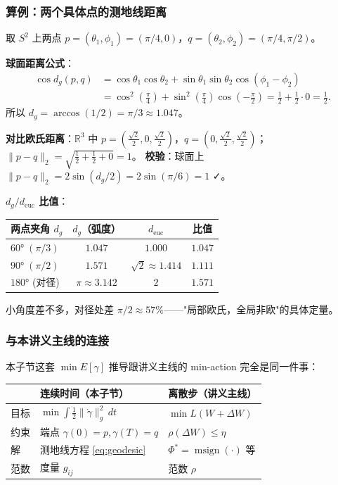 \documentclass[11pt,a4paper]{article}
\theoremstyle{mythm}
\theoremstyle{mydef}
\newcommand{\R}{\mathbb{R}}
\newcommand{\msign}{\operatorname{msign}}
\begin{document}
\subsubsection*{算例：两个具体点的测地线距离}

取 $S^2$ 上两点 $p = (\theta_1,\phi_1) = (\pi/4, 0)$，$q = (\theta_2,\phi_2) = (\pi/4, \pi/2)$。

\textbf{球面距离公式}：
\begin{align*}
\cos d_g(p,q) &= \cos\theta_1\cos\theta_2 + \sin\theta_1\sin\theta_2\cos(\phi_1-\phi_2) \\
              &= \cos^2(\tfrac{\pi}{4}) + \sin^2(\tfrac{\pi}{4})\cos(-\tfrac{\pi}{2}) = \tfrac{1}{2} + \tfrac{1}{2}\cdot 0 = \tfrac{1}{2}.
\end{align*}
所以 $d_g = \arccos(1/2) = \pi/3 \approx 1.047$。

\textbf{对比欧氏距离}：$\R^3$ 中
$p = (\tfrac{\sqrt 2}{2}, 0, \tfrac{\sqrt 2}{2})$，$q = (0, \tfrac{\sqrt 2}{2}, \tfrac{\sqrt 2}{2})$；
$\|p-q\|_2 = \sqrt{\tfrac{1}{2} + \tfrac{1}{2} + 0} = 1$。
\textbf{校验}：球面上 $\|p-q\|_2 = 2\sin(d_g/2) = 2\sin(\pi/6) = 1$ ✓。

\textbf{$d_g/d_{\text{euc}}$ 比值}：
\begin{center}
\begin{tabular}{l|cc|c}
\hline
两点夹角 $d_g$ & $d_g$（弧度） & $d_{\text{euc}}$ & 比值 \\\hline
$60°\;(\pi/3)$ & $1.047$ & $1.000$ & $1.047$ \\
$90°\;(\pi/2)$ & $1.571$ & $\sqrt 2 \approx 1.414$ & $1.111$ \\
$180°$ (对径)   & $\pi \approx 3.142$ & $2$ & $1.571$ \\\hline
\end{tabular}
\end{center}
小角度差不多，对径处差 $\pi/2 \approx 57\%$——"局部欧氏，全局非欧"的具体定量。

\subsubsection*{与本讲义主线的连接}

本子节这套 $\min E[\gamma]$ 推导跟讲义主线的 min-action 完全是同一件事：
\begin{center}
\begin{tabular}{l|l|l}
\hline
& \textbf{连续时间}（本子节） & \textbf{离散步}（讲义主线） \\\hline
目标 & $\min \int \tfrac{1}{2}\|\dot\gamma\|_g^2\,dt$ & $\min L(W + \Delta W)$ \\
约束 & 端点 $\gamma(0) = p,\gamma(T)=q$ & $\rho(\Delta W) \le \eta$ \\
解   & 测地线方程 \eqref{eq:geodesic} & $\Phi^* = \msign(\cdot)$ 等 \\
范数 & 度量 $g_{ij}$ & 范数 $\rho$ \\\hline
\end{tabular}
\end{center}
\end{document}
